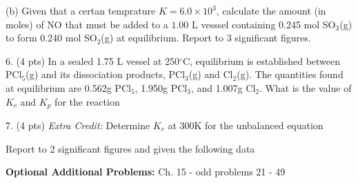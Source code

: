 \documentclass[11pt]{article}
\begin{document}
(b) Given that a certan temprature $K = 6.0\times 10^3$, calculate the amount (in moles)
of NO that must be added to a $1.00$ L vesssel containing 0.245 mol SO$_3$(g) to form
0.240 mol SO$_2$(g) at equilibrium. Report to 3 significant figures.

\pagebreak

6. (4 pts) In a sealed 1.75 L vessel at 250$^\circ$C, equilibrium is established between
PCl$_5$(g) and its dissociation products, PCl$_3$(g) and Cl$_2$(g). The quantities found
at equilibrium are 0.562g PCl$_5$, 1.950g PCl$_3$, and 1.007g Cl$_2$. What is the value of
$K_c$ and $K_p$ for the reaction
\begin{center}
\end{center}

%
%

\vspace{2in}

7. (4 pts) \textit{Extra Credit:} Determine $K_c$ at 300K for the unbalanced equation
\begin{center}
\end{center}
Report to 2 significant figures and given the following data
\begin{center}


\end{center}


\vfill
\textbf{Optional Additional Problems:} Ch. 15 - odd problems 21 - 49 
\end{document}
